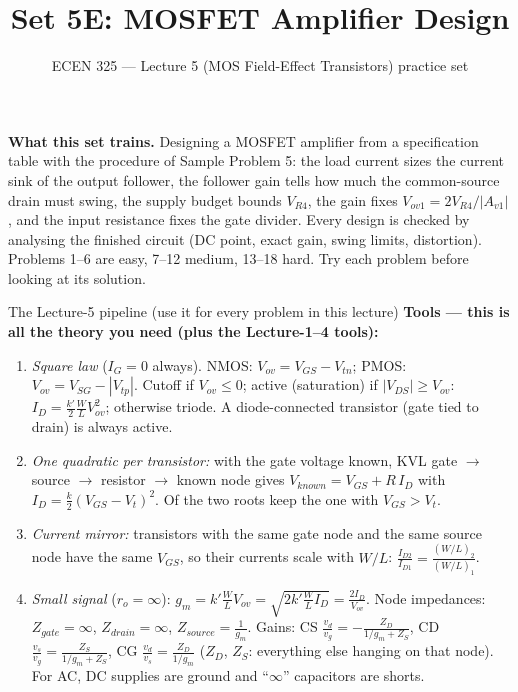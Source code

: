 \documentclass[11pt]{article}
\title{Set 5E: MOSFET Amplifier Design}
\author{ECEN 325 --- Lecture 5 (MOS Field-Effect Transistors) practice set}
\date{}
\begin{document}
\maketitle

\textbf{What this set trains.} Designing a MOSFET amplifier from a specification table with the procedure of
Sample Problem 5: the load current sizes the current sink of the output follower, the follower gain tells how much the
common-source drain must swing, the supply budget bounds $V_{R4}$, the gain fixes $V_{ov1} = 2V_{R4}/|A_{v1}|$, and the
input resistance fixes the gate divider. Every design is checked by analysing the finished circuit (DC point, exact
gain, swing limits, distortion). Problems 1--6 are easy, 7--12 medium, 13--18 hard. Try each problem before looking
at its solution.


\begin{cardbox}{The Lecture-5 pipeline (use it for every problem in this lecture)}
\textbf{Tools --- this is all the theory you need (plus the Lecture-1--4 tools):}
\begin{enumerate}[label=\textbf{T\arabic*},leftmargin=2.2em,itemsep=1pt]
\item \emph{Square law} ($I_G = 0$ always). NMOS: $V_{ov} = V_{GS} - V_{tn}$; PMOS: $V_{ov} = V_{SG} - |V_{tp}|$.
      Cutoff if $V_{ov}\le 0$; active (saturation) if $|V_{DS}| \ge V_{ov}$:
      $I_D = \frac{k'}{2}\frac{W}{L}V_{ov}^2$; otherwise triode.
      A diode-connected transistor (gate tied to drain) is always active.
\item \emph{One quadratic per transistor:} with the gate voltage known, KVL gate $\to$ source $\to$ resistor $\to$
      known node gives $V_{known} = V_{GS} + R\,I_D$ with $I_D = \frac{k}{2}(V_{GS}-V_t)^2$. Of the two roots keep
      the one with $V_{GS} > V_t$.
\item \emph{Current mirror:} transistors with the same gate node and the same source node have the same $V_{GS}$,
      so their currents scale with $W/L$: $\frac{I_{D2}}{I_{D1}} = \frac{(W/L)_2}{(W/L)_1}$.
\item \emph{Small signal} ($r_o = \infty$): $g_m = k'\frac{W}{L}V_{ov} = \sqrt{2k'\frac{W}{L}I_D} = \frac{2I_D}{V_{ov}}$.
      Node impedances: $Z_{gate} = \infty$, $Z_{drain} = \infty$, $Z_{source} = \frac{1}{g_m}$. Gains: CS
      $\frac{v_d}{v_g} = -\frac{Z_D}{1/g_m + Z_S}$, CD $\frac{v_s}{v_g} = \frac{Z_S}{1/g_m + Z_S}$, CG
      $\frac{v_d}{v_s} = \frac{Z_D}{1/g_m}$ ($Z_D$, $Z_S$: everything else hanging on that node). For AC, DC supplies
      are ground and ``$\infty$'' capacitors are shorts.

\end{enumerate}
\end{cardbox}
\end{document}
